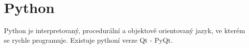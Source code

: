 \newpage
\section{Python}
\nocite{py3:book}

Python je interpretovaný, procedurální a objektově orientovaný jazyk, ve kterém se rychle programuje. Existuje pythoní verze Qt - PyQt.